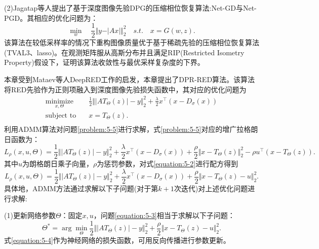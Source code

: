 (2)Jagatap等人提出了基于深度图像先验DPG的压缩相位恢复算法:Net-GD与Net-PGD\supercite{Jagatap}。其相应的优化问题为：
\begin{equation} \label{problem:5-4}
	\min_{w}\quad \frac{1}{2}\Vert{y-\vert{Ax}\vert}\Vert_2^2\quad s.t.\quad x=G(w,z).
\end{equation}
该算法在较低采样率的情况下重构图像质量优于基于稀疏先验的压缩相位恢复算法(TVAL3、lasso)。在观测矩阵服从高斯分布并且满足RIP(Restricted Isometry Property)假设下，证明该算法收敛性与最优采样复杂度的下界。

本章受到Mataev等人DeepRED工作的启发\supercite{Mataev}，本章提出了DPR-RED算法。该算法将RED先验作为正则项融入到深度图像先验损失函数中，其对应的优化问题为
\begin{equation} \label{problem:5-5}
	\begin{aligned} 
		\mathop{\text{minimize}}\limits_{x,\Theta}\quad&\frac{1}{2}\Vert{\vert{AT_{\Theta}(z)}\vert-y}\Vert_2^2+\frac{\lambda}{2}x^\top(x-D_{\sigma}(x)) \\
		\text{subject\ to}\quad &x=T_{\Theta}(z). \\
	\end{aligned}
\end{equation}
利用ADMM算法对问题\eqref{problem:5-5}进行求解，式\eqref{problem:5-5}对应的增广拉格朗日函数为：
\begin{equation} \label{equation:5-2}
	L_{\rho}(x,u,\Theta)=\frac{1}{2}\Vert{\vert{AT_{\Theta}(z)}\vert-y}\Vert_2^2+\frac{\lambda}{2}x^\top(x-D_{\sigma}(x))+\frac{\rho}{2}\Vert{x-T_{\Theta}(z)}\Vert_2^2-\rho{u^\top(x-T_{\Theta}(z))}.
\end{equation}
其中$u$为朗格朗日乘子向量，$\rho$为惩罚参数，对式\ref{equation:5-2}进行配方得到
\begin{equation} \label{equation:5-3}
	L_{\rho}(x,u,\Theta)=\frac{1}{2}\Vert{\vert{AT_{\Theta}(z)}\vert-y}\Vert_2^2+\frac{\lambda}{2}x^\top(x-D_{\sigma}(x))+\frac{\rho}{2}\Vert{x-T_{\Theta}(z)-u}\Vert_2^2.
\end{equation}
具体地，ADMM方法通过求解以下子问题(对于第$k+1$次迭代)对上述优化问题进行求解:

(1)更新网络参数$\Theta$：固定$x,u$，问题\eqref{equation:5-3}相当于求解以下子问题：
\begin{equation} \label{equation:5-4}
	\Theta^*=\arg\min_{\Theta}\frac{1}{2}\Vert{\vert{AT_{\Theta}(z)}\vert-y}\Vert_2^2+\frac{\rho}{2}\Vert{x-T_{\Theta}(z)-u}\Vert_2^2.
\end{equation}
式\eqref{equation:5-4}作为神经网络的损失函数，可用反向传播进行参数更新。

